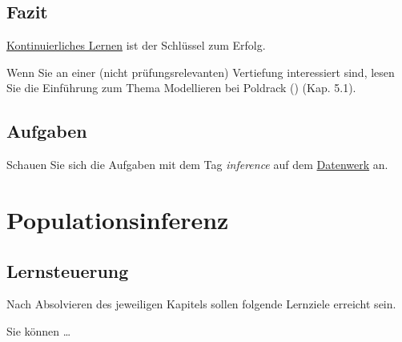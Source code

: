 \documentclass[
  ngerman,
  letterpaper,
  twoside,
  open=any]{scrbook}
\theoremstyle{definition}
\theoremstyle{plain}
\theoremstyle{definition}
\theoremstyle{definition}
\theoremstyle{remark}
\begin{document}
\section{Fazit}\label{fazit}

\begin{tcolorbox}[enhanced jigsaw, arc=.35mm, bottomrule=.15mm, bottomtitle=1mm, breakable, colback=white, colbacktitle=quarto-callout-important-color!10!white, colframe=quarto-callout-important-color-frame, coltitle=black, left=2mm, leftrule=.75mm, opacityback=0, opacitybacktitle=0.6, rightrule=.15mm, title=\textcolor{quarto-callout-important-color}{\faExclamation}\hspace{0.5em}{Wichtig}, titlerule=0mm, toprule=.15mm, toptitle=1mm]

\href{https://imgflip.com/i/77wn7m}{Kontinuierliches
Lernen}\footnotemark{} ist der Schlüssel zum Erfolg.

\end{tcolorbox}


Wenn Sie an einer (nicht prüfungsrelevanten) Vertiefung interessiert
sind, lesen Sie die Einführung zum Thema Modellieren bei Poldrack
() (Kap. 5.1).

\section{Aufgaben}\label{aufgaben}

Schauen Sie sich die Aufgaben mit dem Tag \emph{inference} auf dem
\href{https://datenwerk.netlify.app/\#category=inference}{Datenwerk} an.

\chapter{Populationsinferenz}\label{sec-inferenz}

\section{Lernsteuerung}\label{lernsteuerung-1}

Nach Absolvieren des jeweiligen Kapitels sollen folgende Lernziele
erreicht sein.

Sie können \ldots{}
\end{document}
